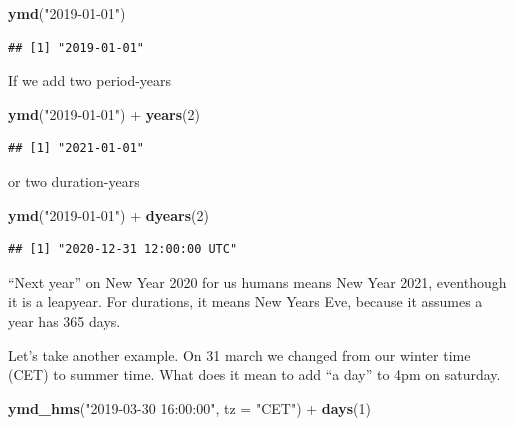 \documentclass[]{tufte-book}
\newenvironment{Shaded}{}{}
\newcommand{\DataTypeTok}[1]{\textcolor[rgb]{0.56,0.13,0.00}{#1}}
\newcommand{\DecValTok}[1]{\textcolor[rgb]{0.25,0.63,0.44}{#1}}
\newcommand{\KeywordTok}[1]{\textcolor[rgb]{0.00,0.44,0.13}{\textbf{#1}}}
\newcommand{\NormalTok}[1]{#1}
\newcommand{\OperatorTok}[1]{\textcolor[rgb]{0.40,0.40,0.40}{#1}}
\newcommand{\StringTok}[1]{\textcolor[rgb]{0.25,0.44,0.63}{#1}}
\begin{document}
\begin{Shaded}
\begin{Highlighting}[]
\KeywordTok{ymd}\NormalTok{(}\StringTok{"2019-01-01"}\NormalTok{)}
\end{Highlighting}
\end{Shaded}

\begin{verbatim}
## [1] "2019-01-01"
\end{verbatim}

If we add two period-years

\begin{Shaded}
\begin{Highlighting}[]
\KeywordTok{ymd}\NormalTok{(}\StringTok{"2019-01-01"}\NormalTok{) }\OperatorTok{+}\StringTok{ }\KeywordTok{years}\NormalTok{(}\DecValTok{2}\NormalTok{)}
\end{Highlighting}
\end{Shaded}

\begin{verbatim}
## [1] "2021-01-01"
\end{verbatim}

or two duration-years

\begin{Shaded}
\begin{Highlighting}[]
\KeywordTok{ymd}\NormalTok{(}\StringTok{"2019-01-01"}\NormalTok{) }\OperatorTok{+}\StringTok{ }\KeywordTok{dyears}\NormalTok{(}\DecValTok{2}\NormalTok{)}
\end{Highlighting}
\end{Shaded}

\begin{verbatim}
## [1] "2020-12-31 12:00:00 UTC"
\end{verbatim}

``Next year'' on New Year 2020 for us humans means New Year 2021, eventhough it is a leapyear. For durations, it means New Years Eve, because it assumes a year has 365 days.

Let's take another example. On 31 march we changed from our winter time (CET) to summer time. What does it mean to add ``a day'' to 4pm on saturday.

\begin{Shaded}
\begin{Highlighting}[]
\KeywordTok{ymd_hms}\NormalTok{(}\StringTok{"2019-03-30 16:00:00"}\NormalTok{, }\DataTypeTok{tz =} \StringTok{"CET"}\NormalTok{) }\OperatorTok{+}\StringTok{ }\KeywordTok{days}\NormalTok{(}\DecValTok{1}\NormalTok{)}
\end{Highlighting}
\end{Shaded}
\end{document}
